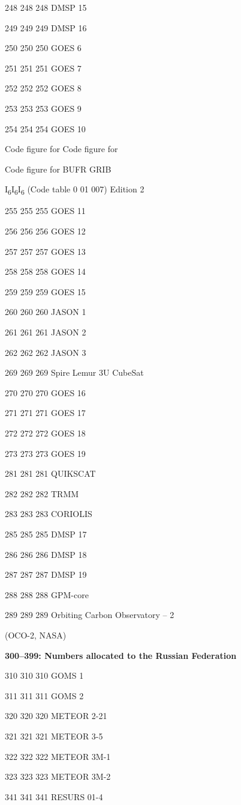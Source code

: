 248 248 248 DMSP 15

249 249 249 DMSP 16

250 250 250 GOES 6

251 251 251 GOES 7

252 252 252 GOES 8

253 253 253 GOES 9

254 254 254 GOES 10

Code figure for Code figure for

Code figure for BUFR GRIB

I\textsubscript{6}I\textsubscript{6}I\textsubscript{6} (Code table 0 01 007) Edition 2

255 255 255 GOES 11

256 256 256 GOES 12

257 257 257 GOES 13

258 258 258 GOES 14

259 259 259 GOES 15

260 260 260 JASON 1

261 261 261 JASON 2

262 262 262 JASON 3

269 269 269 Spire Lemur 3U CubeSat

270 270 270 GOES 16

271 271 271 GOES 17

272 272 272 GOES 18

273 273 273 GOES 19

281 281 281 QUIKSCAT

282 282 282 TRMM

283 283 283 CORIOLIS

285 285 285 DMSP 17

286 286 286 DMSP 18

287 287 287 DMSP 19

288 288 288 GPM-core

289 289 289 Orbiting Carbon Observatory -- 2~

(OCO-2, NASA)

\textbf{300--399: Numbers allocated to the Russian Federation}

310 310 310 GOMS 1

311 311 311 GOMS 2

320 320 320 METEOR 2-21

321 321 321 METEOR 3-5

322 322 322 METEOR 3M-1

323 323 323 METEOR 3M-2

341 341 341 RESURS 01-4

